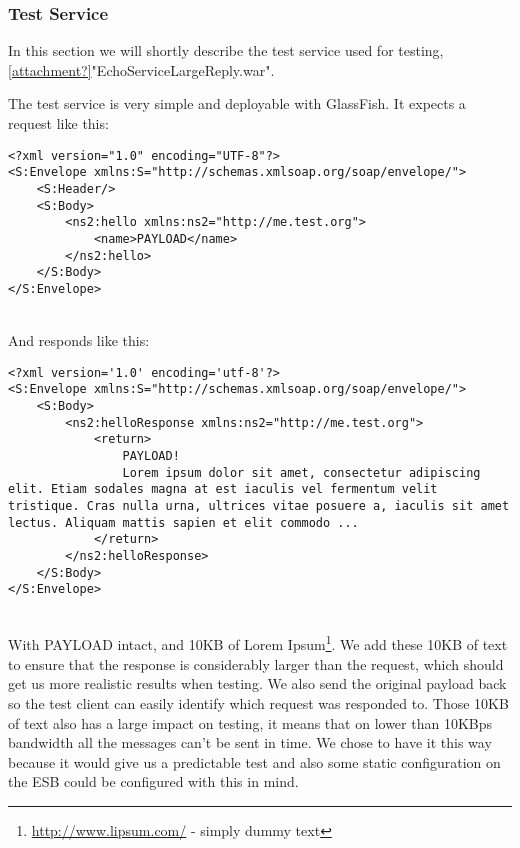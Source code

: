 \subsubsection{Test Service}\label{Testing:About:Service}
    In this section we will shortly describe the test service used for testing, \ref{attachment?}"EchoServiceLargeReply.war".

    The test service is very simple and deployable with GlassFish. It expects a request like this:
    \lstset{language=XML, style=xml}
    \begin{lstlisting}
<?xml version="1.0" encoding="UTF-8"?>
<S:Envelope xmlns:S="http://schemas.xmlsoap.org/soap/envelope/">
    <S:Header/>
    <S:Body>
        <ns2:hello xmlns:ns2="http://me.test.org">
            <name>PAYLOAD</name>
        </ns2:hello>
    </S:Body>
</S:Envelope>
    \end{lstlisting}
    \\
    And responds like this:
    \begin{lstlisting}
<?xml version='1.0' encoding='utf-8'?>
<S:Envelope xmlns:S="http://schemas.xmlsoap.org/soap/envelope/">
    <S:Body>
        <ns2:helloResponse xmlns:ns2="http://me.test.org">
            <return>
                PAYLOAD!
                Lorem ipsum dolor sit amet, consectetur adipiscing elit. Etiam sodales magna at est iaculis vel fermentum velit tristique. Cras nulla urna, ultrices vitae posuere a, iaculis sit amet lectus. Aliquam mattis sapien et elit commodo ...
            </return>
        </ns2:helloResponse>
    </S:Body>
</S:Envelope>
    \end{lstlisting}
    \\
    With PAYLOAD intact, and 10KB of Lorem Ipsum\footnote{\url{http://www.lipsum.com/} - simply dummy text}. We add these 10KB of text to ensure that the response is considerably larger than the request, which should get us more realistic results when testing. We also send the original payload back so the test client can easily identify which request was responded to. Those 10KB of text also has a large impact on testing, it means that on lower than 10KBps bandwidth all the messages can't be sent in time. We chose to have it this way because it would give us a predictable test and also some static configuration on the ESB could be configured with this in mind.
